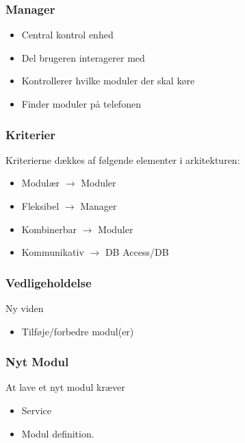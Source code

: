 \begin{frame}
\frametitle{Manager}
\begin{itemize}
\item Central kontrol enhed
\item Del brugeren interagerer med
\item Kontrollerer hvilke moduler der skal køre
\item Finder moduler på telefonen
\end{itemize}
\end{frame}

\begin{frame}
\frametitle{Kriterier}
Kriterierne dækkes af følgende elementer i arkitekturen:
\begin{itemize}
\item Modulær $\rightarrow$ Moduler
\item Fleksibel $\rightarrow$ Manager
\item Kombinerbar $\rightarrow$ Moduler
\item Kommunikativ $\rightarrow$ DB Access/DB
\end{itemize}
\end{frame}

\begin{frame}
\frametitle{Vedligeholdelse}
Ny viden
\begin{itemize}
\item Tilføje/forbedre modul(er)
\end{itemize}

\end{frame}

\begin{frame}
\frametitle{Nyt Modul}
At lave et nyt modul kræver
\begin{itemize}
\item Service
\item Modul definition.
\end{itemize}
\end{frame}

